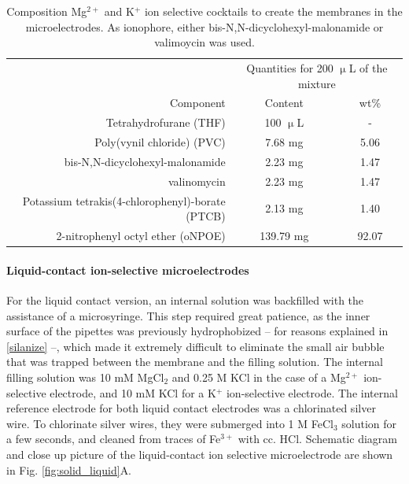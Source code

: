 \begin{table}
                \caption[Composition Mg$^{2+}$ and K$^+$ ion selective cocktails to create the membranes in the microelectrodes.]{Composition Mg$^{2+}$ and K$^+$ ion selective cocktails to create the membranes in the microelectrodes.
As ionophore, either bis-N,N-dicyclohexyl-malonamide or valimoycin was used.}
                \label{table:cocktail}
                \centering
                \begin{tabular}{r c c}
			& \multicolumn{2}{c}{Quantities for 200 $\upmu$L of the mixture}\\
			\cline{2-3}
                        Component & Content & wt\% \\
                        \hline
                        Tetrahydrofurane (THF) & 100 $\upmu$L & - \\
                        Poly(vynil chloride) (PVC) & 7.68 mg & 5.06 \\
                        bis-N,N-dicyclohexyl-malonamide & 2.23 mg & 1.47 \\
			valinomycin & 2.23 mg & 1.47 \\
                        Potassium tetrakis(4-chlorophenyl)-borate (PTCB) & 2.13 mg & 1.40 \\
			2-nitrophenyl octyl ether (oNPOE) & 139.79 mg & 92.07 \\
                \end{tabular}
\end{table}

				\paragraph{Liquid-contact ion-selective microelectrodes}
For the liquid contact version, an internal solution was backfilled with the assistance of a microsyringe.
This step required great patience, as the inner surface of the pipettes was previously hydrophobized -- for reasons explained in \ref{silanize} --, which made it extremely difficult to eliminate the small air bubble that was trapped between the membrane and the filling solution.
The internal filling solution was 10 mM MgCl$_2$ and 0.25 M KCl in the case of a Mg$^{2+}$ ion-selective electrode, and 10 mM KCl for a K$^+$ ion-selective electrode.
The internal reference electrode for both liquid contact electrodes was a chlorinated silver wire.
To chlorinate silver wires, they were submerged into 1 M FeCl$_3$ solution for a few seconds, and cleaned from traces of Fe$^{3+}$ with cc. HCl.
Schematic diagram and close up picture of the liquid-contact ion selective microelectrode are shown in Fig. \ref{fig:solid_liquid}A.

